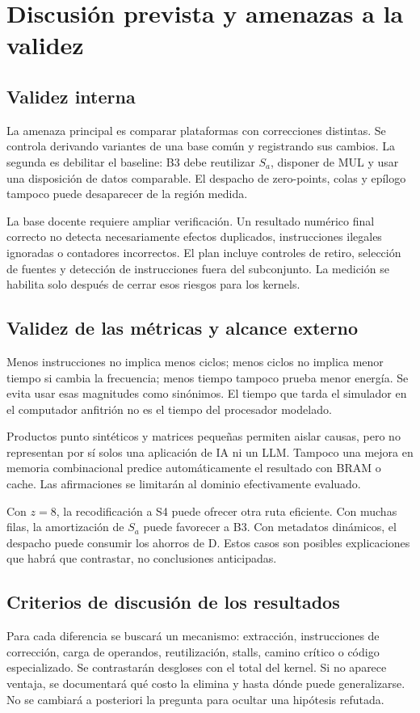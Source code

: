 \section{Discusión prevista y amenazas a la validez}
\subsection{Validez interna}
La amenaza principal es comparar plataformas con correcciones distintas.
Se controla derivando variantes de una base común y registrando sus cambios.
La segunda es debilitar el baseline: B3 debe reutilizar \(S_a\), disponer de
MUL y usar una disposición de datos comparable. El despacho de zero-points,
colas y epílogo tampoco puede desaparecer de la región medida.

La base docente requiere ampliar verificación. Un resultado numérico final
correcto no detecta necesariamente efectos duplicados, instrucciones ilegales
ignoradas o contadores incorrectos. El plan incluye controles de retiro,
selección de fuentes y detección de instrucciones fuera del subconjunto.
La medición se habilita solo después de cerrar esos riesgos para los kernels.

\subsection{Validez de las métricas y alcance externo}
Menos instrucciones no implica menos ciclos; menos ciclos no implica menor
tiempo si cambia la frecuencia; menos tiempo tampoco prueba menor energía.
Se evita usar esas magnitudes como sinónimos. El tiempo que tarda el simulador
en el computador anfitrión no es el tiempo del procesador modelado.

Productos punto sintéticos y matrices pequeñas permiten aislar causas, pero
no representan por sí solos una aplicación de IA ni un LLM. Tampoco una mejora
en memoria combinacional predice automáticamente el resultado con BRAM o
cache. Las afirmaciones se limitarán al dominio efectivamente evaluado.

Con \(z=8\), la recodificación a S4 puede ofrecer otra ruta eficiente. Con
muchas filas, la amortización de \(S_a\) puede favorecer a B3. Con metadatos
dinámicos, el despacho puede consumir los ahorros de D. Estos casos son
posibles explicaciones que habrá que contrastar, no conclusiones anticipadas.

\subsection{Criterios de discusión de los resultados}
Para cada diferencia se buscará un mecanismo: extracción, instrucciones de
corrección, carga de operandos, reutilización, stalls, camino crítico o código
especializado. Se contrastarán desgloses con el total del kernel. Si no aparece
ventaja, se documentará qué costo la elimina y hasta dónde puede generalizarse.
No se cambiará a posteriori la pregunta para ocultar una hipótesis refutada.

